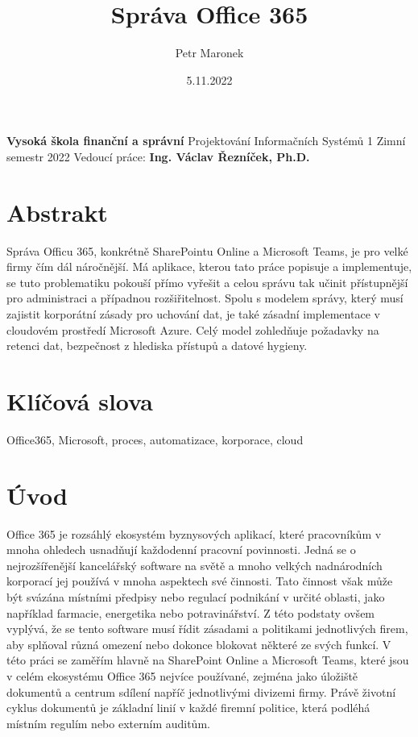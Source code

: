 \documentclass{article}
\title{Správa Office 365}
\author{Petr Maronek}
\date{5.11.2022}
\begin{document}
    \begin{sloppypar}
	\begin{spacing}{1.15}
		\rmfamily
		\maketitle
		\begin{center}
			\textbf{Vysoká škola finanční a správní}\linebreak
			Projektování Informačních Systémů 1\linebreak
			Zimní semestr 2022\linebreak
			Vedoucí práce: \textbf{Ing. Václav Řezníček, Ph.D.}
		\end{center}
		\pagebreak
			
		\section*{Abstrakt}
		Správa Officu 365, konkrétně SharePointu Online a Microsoft Teams, je pro velké 
        firmy čím dál náročnější. Má aplikace, kterou tato práce popisuje a implementuje, 
        se tuto problematiku pokouší přímo vyřešit a celou správu tak učinit přístupnější 
        pro administraci a případnou rozšiřitelnost. Spolu s modelem správy, který musí 
        zajistit korporátní zásady pro uchování dat, je také zásadní implementace v cloudovém 
        prostředí Microsoft Azure. Celý model zohledňuje požadavky na retenci dat, bezpečnost 
        z hlediska přístupů a datové hygieny.

		\section*{Klíčová slova}
		Office365, Microsoft, proces, automatizace, korporace, cloud
		\pagebreak
		    
		\section*{Úvod}
	    Office 365 je rozsáhlý ekosystém byznysových aplikací, které pracovníkům
        v mnoha ohledech usnadňují každodenní pracovní povinnosti. Jedná se o 
        nejrozšířenější kancelářský software na světě a mnoho velkých 
        nadnárodních korporací jej používá v mnoha aspektech své činnosti. 
        Tato činnost však může být svázána místními předpisy nebo regulací 
        podnikání v určité oblasti, jako například farmacie, energetika nebo 
        potravinářství. Z této podstaty ovšem vyplývá, že se tento software musí
        řídit zásadami a politikami jednotlivých firem, aby splňoval různá 
        omezení nebo dokonce blokovat některé ze svých funkcí. V této práci se 
        zaměřím hlavně na SharePoint Online a Microsoft Teams, které jsou v celém 
        ekosystému Office 365 nejvíce používané, zejména jako úložiště dokumentů 
        a centrum sdílení napříč jednotlivými divizemi firmy. Právě životní 
        cyklus dokumentů je základní linií v každé firemní politice, která 
        podléhá místním regulím nebo externím auditům.


\end{spacing}
\end{sloppypar}
\end{document}
